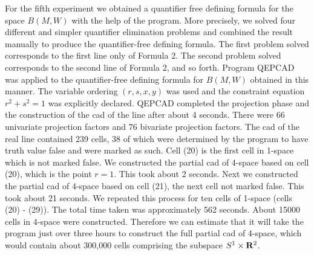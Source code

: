 For the fifth experiment we obtained a quantifier free
defining formula for the space $B(M,W)$ with the help of
the program. More precisely, we solved four different and simpler
quantifier elimination problems and combined the result
manually to produce the quantifier-free defining formula.
The first problem solved corresponds to the first line only of Formula 2.
The second problem solved corresponds to the second line
of Formula 2, and so forth.
Program QEPCAD was applied to the quantifier-free defining
formula for $B(M,W)$ obtained in this manner.
The variable ordering $(r,s,x,y)$ was used and the
constraint equation $r^{2} + s^{2} = 1$ was explicitly declared.
QEPCAD completed the projection phase and the construction
of the cad of the line after about 4 seconds.
There were 66 univariate projection factors and 76 bivariate
projection factors.
The cad of the real line contained 239 cells, 38 of which
were determined by the program to have truth value false
and were marked as such.
Cell (20) is the first cell in 1-space which is not marked false.
We constructed the partial cad of 4-space based on cell (20),
which is the point $r = 1$. This took about 2 seconds.
Next we constructed the partial cad of 4-space based on
cell (21), the next cell not marked false.
This took about 21 seconds.
We repeated this process for ten cells of 1-space
(cells (20) - (29)). The total time taken was approximately
562 seconds. About 15000 cells in 4-space were constructed.
Therefore we can estimate that it will take the program
just over three hours to construct the full partial cad
of 4-space, which would contain about 300,000 cells
comprising the subspace $S^{1} \times {\bf R}^{2}$.

